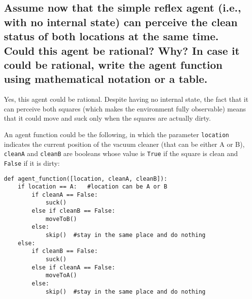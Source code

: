 \documentclass{article}
\begin{document}
\subsection{Assume now that the simple reflex agent (i.e., with no internal state) can perceive the clean status of both locations at the same time.
Could this agent be rational? Why? In case it could be rational, write the agent function using mathematical notation or a table.}
Yes, this agent could be rational.
Despite having no internal state, the fact that it can perceive both squares (which makes the environment fully observable) means that it could move and suck only when the squares are actually dirty.

An agent function could be the following, in which the parameter \texttt{location} indicates the current position of the vacuum cleaner (that can be either A or B), \texttt{cleanA} and \texttt{cleanB} are booleans whose value is \texttt{True} if the square is clean and \texttt{False} if it is dirty:
\begin{verbatim}
def agent_function([location, cleanA, cleanB]):
    if location == A:	#location can be A or B
        if cleanA == False:
            suck()
        else if cleanB == False:
            moveToB()
        else:
            skip()	#stay in the same place and do nothing
    else:
        if cleanB == False:
            suck()
        else if cleanA == False:
            moveToA()
        else:
            skip()	#stay in the same place and do nothing

\end{verbatim}


\end{document}
